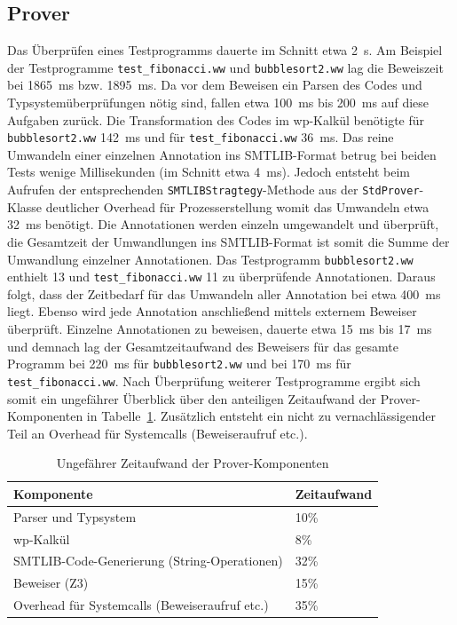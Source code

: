 \subsection{Prover}
Das Überprüfen eines Testprogramms dauerte im Schnitt etwa 2~s. Am Beispiel der Testprogramme \texttt{test\_fibonacci.ww} und \texttt{bubblesort2.ww} lag die Beweiszeit bei 1865~ms bzw. 1895~ms. Da vor dem Beweisen ein Parsen des Codes und Typsystemüberprüfungen nötig sind, fallen etwa 100~ms bis 200~ms auf diese Aufgaben zurück. Die Transformation des Codes im wp-Kalkül benötigte für \texttt{bubblesort2.ww} 142~ms und für \texttt{test\_fibonacci.ww} 36~ms. Das reine Umwandeln einer einzelnen Annotation ins SMTLIB-Format betrug bei beiden Tests wenige Millisekunden (im Schnitt etwa 4~ms). Jedoch entsteht beim Aufrufen der entsprechenden \texttt{SMTLIBStragtegy}-Methode aus der \texttt{StdProver}-Klasse deutlicher Overhead für Prozesserstellung womit das Umwandeln etwa 32~ms benötigt. Die Annotationen werden einzeln umgewandelt und überprüft, die Gesamtzeit der Umwandlungen ins SMTLIB-Format ist somit die Summe der Umwandlung einzelner Annotationen. Das Testprogramm \texttt{bubblesort2.ww} enthielt 13 und \texttt{test\_fibonacci.ww} 11 zu überprüfende Annotationen. Daraus folgt, dass der Zeitbedarf für das Umwandeln aller Annotation bei etwa 400~ms liegt. Ebenso wird jede Annotation anschließend mittels externem Beweiser überprüft. Einzelne Annotationen zu beweisen, dauerte etwa 15~ms bis 17~ms und demnach lag der Gesamtzeitaufwand des Beweisers für das gesamte Programm bei 220~ms für \texttt{bubblesort2.ww} und bei 170~ms für \texttt{test\_fibonacci.ww}. Nach Überprüfung weiterer Testprogramme ergibt sich somit ein ungefährer Überblick über den anteiligen Zeitaufwand der Prover-Komponenten in Tabelle~\ref{zeitaufwandprover}. Zusätzlich entsteht ein nicht zu vernachlässigender Teil an Overhead für Systemcalls (Beweiseraufruf etc.).

\begin{table}
\centering
\caption{Ungefährer Zeitaufwand der Prover-Komponenten}
\label{zeitaufwandprover}
\begin{tabular}{|l|l|}
\hline
\textbf{Komponente} & \textbf{Zeitaufwand} \\
\hline
Parser und Typsystem & 10\% \\
\hline
wp-Kalkül & 8\% \\
\hline
SMTLIB-Code-Generierung (String-Operationen) & 32\% \\
\hline
Beweiser (Z3) & 15\% \\
\hline
Overhead für Systemcalls (Beweiseraufruf etc.) & 35\% \\
\hline
\end{tabular}
\end{table}

